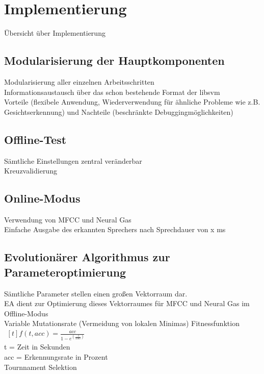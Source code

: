 \chapter{Implementierung}
Übersicht über Implementierung

\section{Modularisierung der Hauptkomponenten}
Modularisierung aller einzelnen Arbeitsschritten\\
Informationsaustausch über das schon bestehende Format der libsvm\\
Vorteile (flexibele Anwendung, Wiederverwendung für ähnliche Probleme wie z.B. Gesichtserkennung) und Nachteile (beschränkte Debuggingmöglichkeiten)

\section{Offline-Test}
Sämtliche Einstellungen zentral veränderbar\\
Kreuzvalidierung

\section{Online-Modus}
Verwendung von MFCC und Neural Gas\\
Einfache Ausgabe des erkannten Sprechers nach Sprechdauer von x ms

\section{Evolutionärer Algorithmus zur Parameteroptimierung}
Sämtliche Parameter stellen einen großen Vektorraum dar.\\
EA dient zur Optimierung dieses Vektorraumes für MFCC und Neural Gas im Offline-Modus\\
Variable Mutationsrate (Vermeidung von lokalen Minimas)
Fitnessfunktion $\begin{aligned}[t]f(t,acc) = \frac{acc}{1 - e^{\left(\frac{-t}{1000}\right)}}\end{aligned}$\\
t = Zeit in Sekunden\\
acc = Erkennungsrate in Prozent\\
Tournnament Selektion
